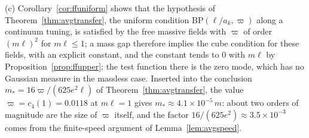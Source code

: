 \begin{remark}
(c) Corollary~\ref{cor:ffuniform} shows that the hypothesis of
Theorem~\ref{thm:avgtransfer}, the uniform condition $\mathrm{BP}(\ell/a_k,
\varpi)$ along a continuum tuning, is satisfied by the free massive fields
with $\varpi$ of order $(m\ell)^2$ for $m\ell\le1$; a mass gap therefore
implies the cube condition for these fields, with an explicit constant, and
the constant tends to $0$ with $m\ell$ by Proposition~\ref{prop:ffupper}; the
test function there is the zero mode, which has no Gaussian measure in the
massless case.
Inserted into the conclusion $m_*=16\varpi/(625e^2\ell)$ of
Theorem~\ref{thm:avgtransfer}, the value $\varpi=c_4(1)=0.0118$ at $m\ell=1$
gives $m_*\approx4.1\times10^{-5}\,m$: about two orders of magnitude are
the size of $\varpi$ itself, and the factor $16/(625e^2)\approx3.5\times
10^{-3}$ comes from the finite-speed argument of Lemma~\ref{lem:avgspeed}.
\end{remark}
